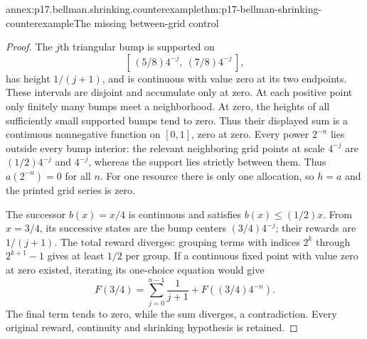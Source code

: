 \begin{annexitem}{annex:p17.bellman.shrinking.counterexample}{thm:p17-bellman-shrinking-counterexample}{The missing between-grid control}
\begin{proof}
The \(j\)th triangular bump is supported on
\[
             [\, (5/8)4^{-j},\ (7/8)4^{-j}\,],
\]
has height \(1/(j+1)\), and is continuous
with value zero at its two endpoints.
These intervals are disjoint and accumulate
only at zero. At each positive point
only finitely many bumps meet a neighborhood.
At zero, the heights of all sufficiently
small supported bumps tend to zero.
Thus their displayed sum is a continuous
nonnegative function on \([0,1]\), zero
at zero.
Every power \(2^{-n}\) lies outside every
bump interior: the relevant neighboring
grid points at scale \(4^{-j}\) are
\((1/2)4^{-j}\) and \(4^{-j}\), whereas
the support lies strictly between them.
Thus \(a(2^{-n})=0\) for all \(n\).
For one resource there is only one allocation,
so \(h=a\) and the printed grid series is zero.

The successor \(b(x)=x/4\) is continuous
and satisfies \(b(x)\leq(1/2)x\).
From \(x=3/4\), its successive states
are the bump centers \((3/4)4^{-j}\);
their rewards are \(1/(j+1)\).
The total reward diverges: grouping terms
with indices \(2^k\) through \(2^{k+1}-1\)
gives at least \(1/2\) per group.
If a continuous fixed point with value
zero at zero existed, iterating its
one-choice equation would give
\[
 F(3/4)=\sum_{j=0}^{n-1}\frac1{j+1}
                              +F((3/4)4^{-n}).
\]
The final term tends to zero, while the
sum diverges, a contradiction.
Every original reward, continuity and
shrinking hypothesis is retained.
\end{proof}
\end{annexitem}

